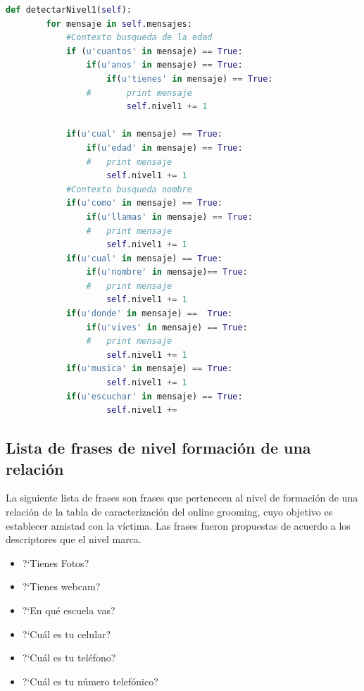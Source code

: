 \begin{lstlisting}[language=Python]
def detectarNivel1(self):	
		for mensaje in self.mensajes:
			#Contexto busqueda de la edad
			if (u'cuantos' in mensaje) == True:
				if(u'anos' in mensaje) == True:
					if(u'tienes' in mensaje) == True:
				#		print mensaje
						self.nivel1 += 1
	
			if(u'cual' in mensaje) == True:
				if(u'edad' in mensaje) == True:
				#	print mensaje
					self.nivel1 += 1
			#Contexto busqueda nombre
			if(u'como' in mensaje) == True:
				if(u'llamas' in mensaje) == True:
				#	print mensaje
					self.nivel1 += 1
			if(u'cual' in mensaje) == True:
				if(u'nombre' in mensaje)== True:
				#	print mensaje
					self.nivel1 += 1
			if(u'donde' in mensaje) ==  True:
				if(u'vives' in mensaje) == True:
				#	print mensaje
					self.nivel1 += 1
			if(u'musica' in mensaje) == True:
					self.nivel1 += 1
			if(u'escuchar' in mensaje) == True:
					self.nivel1 += 
\end{lstlisting}



\subsection{Lista de frases de nivel formaci\'on de una relaci\'on}
La siguiente lista de frases son frases que pertenecen al nivel de formaci\'on de una relaci\'on de la tabla de caracterizaci\'on del online grooming, cuyo objetivo es establecer amistad con la v\'ictima. 
Las frases fueron propuestas de acuerdo a los descriptores que el nivel marca.

\begin{itemize}
\item ?`Tienes Fotos?
\item ?`Tienes webcam?
\item ?`En qu\'e escuela vas?
\item ?`Cu\'al es tu celular?
\item ?`Cu\'al es tu tel\'efono?
\item ?`Cu\'al es tu n\'umero telef\'onico?
\end{itemize}

